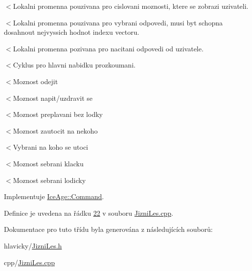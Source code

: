 $<$Lokalni promenna pouzivana pro cislovani moznosti, ktere se zobrazi uzivateli.

$<$Lokalni promenna pouzivana pro vybrani odpovedi, musi byt schopna dosahnout nejvyssich hodnot indexu vectoru.

$<$Lokalni promenna pozivana pro nacitani odpovedi od uzivatele.

$<$Cyklus pro hlavni nabidku prozkoumani.

$<$Moznost odejit

$<$Moznost napit/uzdravit se

$<$Moznost preplavani bez lodky

$<$Moznost zautocit na nekoho

$<$Vybrani na koho se utoci

$<$Moznost sebrani klacku

$<$Moznost sebrani lodicky 

Implementuje \hyperlink{classIceAge_1_1Command_a0466e88c0c9e2a44618c12f6c88b76fe}{Ice\+Age\+::\+Command}.



Definice je uvedena na řádku \hyperlink{JizniLes_8cpp_source_l00022}{22} v souboru \hyperlink{JizniLes_8cpp_source}{Jizni\+Les.\+cpp}.



Dokumentace pro tuto třídu byla generována z následujících souborů\+:\begin{DoxyCompactItemize}
\item 
hlavicky/\hyperlink{JizniLes_8h}{Jizni\+Les.\+h}\item 
cpp/\hyperlink{JizniLes_8cpp}{Jizni\+Les.\+cpp}\end{DoxyCompactItemize}
